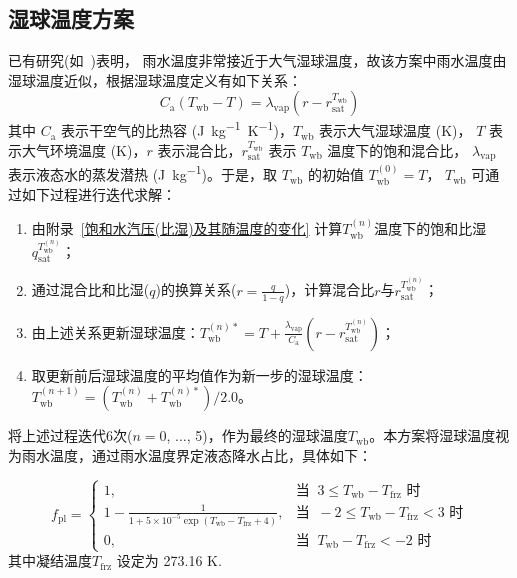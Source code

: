 \subsection{湿球温度方案}\label{湿球温度方案}
已有研究(如~\citet{anderson1998moored})表明，
雨水温度非常接近于大气湿球温度，故该方案中雨水温度由湿球温度近似，根据湿球温度定义有如下关系：
\begin{equation}
  \label{eq:湿球温度定义}
  C_{\mathrm{a}}\left(T_{\mathrm{w b}}-T\right)=\lambda_{\mathrm{vap}}\left(r-r_{\mathrm{s a t}}^{T_{\mathrm{w b}}}\right)
\end{equation}
其中 $C_{\mathrm{a}}$ 表示干空气的比热容 (\unit{J.kg^{-1}.K^{-1}})，$T_{\mathrm{wb}}$ 表示大气湿球温度 (K)，
$T$ 表示大气环境温度 (K)，$r$ 表示混合比，$r_{\mathrm{sat}}^{T_{\mathrm{wb}}}$ 表示 $T_{\mathrm{wb}}$ 温度下的饱和混合比，
$\lambda_{\mathrm {vap}}$ 表示液态水的蒸发潜热 (\unit{J.kg^{-1}})。于是，取 $T_{\mathrm{wb}}$ 的初始值 $T_{\mathrm{wb}}^{\left(0\right)}=T$，
$T_{\mathrm{wb}}$ 可通过如下过程进行迭代求解：
\begin{enumerate}
  \item 由附录~\ref{饱和水汽压(比湿)及其随温度的变化} 计算$T_{\mathrm{wb}}^{\left(n\right)}$温度下的饱和比湿$q_{\mathrm{sat}}^{T_{\mathrm{wb}}^{\left(n\right)}}$；
  \item 通过混合比和比湿($q$)的换算关系($r=\frac{q}{1-q}$)，计算混合比$r$与$r_{\mathrm{sat}}^{T_{\mathrm{wb}}^{\left(n\right)}}$；
  \item 由上述关系更新湿球温度：$T_{\mathrm{wb}}^{\left(n\right)\ast}=T+\frac{\lambda_{\mathrm {vap}}}{C_{\mathrm{a}}}\left(r-r_{\mathrm{sat}}^{T_{\mathrm{wb}}^{\left(n\right)}}\right)$；
  \item 取更新前后湿球温度的平均值作为新一步的湿球温度：$T_{\mathrm{wb}}^{\left(n+1\right)}=\left(T_{\mathrm{wb}}^{\left(n\right)}+T_{\mathrm{wb}}^{\left(n\right)\ast}\right)/2.0$。
\end{enumerate}
将上述过程迭代6次($n=0$, $\ldots$, 5)，作为最终的湿球温度$T_{\mathrm{wb}}$。本方案将湿球温度视为雨水温度，通过雨水温度界定液态降水占比，具体如下：

\begin{equation}
  f_{\mathrm{pl}}= \begin{cases}
    1, & \text{当 }\ 3\leqslant T_{\mathrm{wb}} - T_{\mathrm{frz}} \text{ 时} \\
    1 - \frac{1}{1 + 5\times10^{-5}\exp{(T_{\mathrm{wb}} - T_{\mathrm{frz}}+4)}} , & \text{当 }\ -2\leqslant T_{\mathrm{wb}} - T_{\mathrm{frz}} < 3 \text{ 时} \\
    0, & \text{当 }\ T_{\mathrm{wb}} - T_{\mathrm{frz}} < -2 \text{ 时}
  \end{cases}
\end{equation}
%
其中凝结温度$T_{\mathrm{frz}}$ 设定为 273.16 K.


